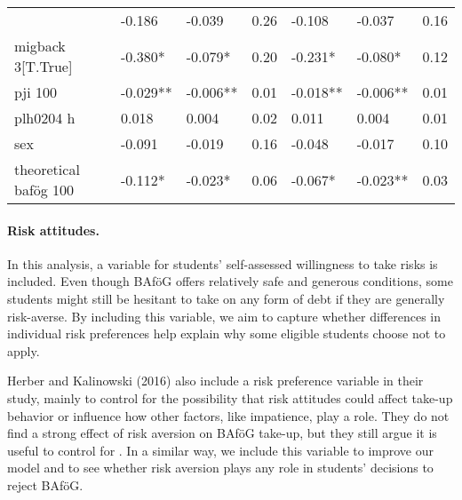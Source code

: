 \begin{table}[htbp]
\begin{tabular}{lllllll}
\begin{tabular}{lrrrrrr}
migback 2[T.True]       & -0.186    & -0.039     & 0.26     & -0.108    & -0.037     & 0.16     \\
migback 3[T.True]       & -0.380*   & -0.079*    & 0.20     & -0.231*   & -0.080*    & 0.12     \\
pji 100                 & -0.029**  & -0.006**   & 0.01     & -0.018**  & -0.006**   & 0.01     \\
plh0204 h               & 0.018     & 0.004      & 0.02     & 0.011     & 0.004      & 0.01     \\
sex                     & -0.091    & -0.019     & 0.16     & -0.048    & -0.017     & 0.10     \\
theoretical bafög 100   & -0.112*   & -0.023*    & 0.06     & -0.067*   & -0.023**   & 0.03     \\
\bottomrule
\end{tabular}
\end{table}


\paragraph{Risk attitudes.} In this analysis, a variable for students' self-assessed willingness to take risks is included. Even though BAföG offers relatively safe and generous conditions, some students might still be hesitant to take on any form of debt if they are generally risk-averse. By including this variable, we aim to capture whether differences in individual risk preferences help explain why some eligible students choose not to apply.

Herber and Kalinowski (2016) also include a risk preference variable in their study, mainly to control for the possibility that risk attitudes could affect take-up behavior or influence how other factors, like impatience, play a role. They do not find a strong effect of risk aversion on BAföG take-up, but they still argue it is useful to control for \citep{herber_non-take-up_2019}. In a similar way, we include this variable to improve our model and to see whether risk aversion plays any role in students’ decisions to reject BAföG.

